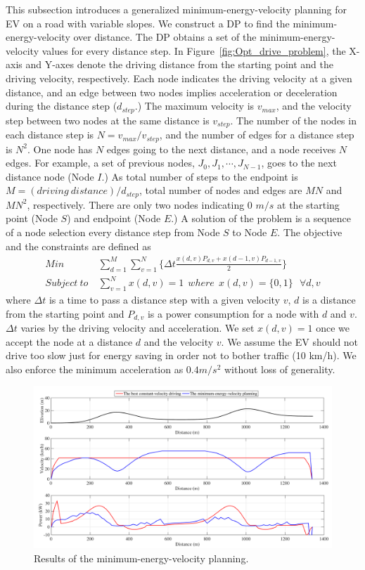 \documentclass{IEEEtran}
\begin{document}
This subsection introduces a generalized minimum-energy-velocity planning for EV  on a road with variable slopes. We construct a DP to find the minimum-energy-velocity over distance. The DP obtains a set of the minimum-energy-velocity values for every distance step. In Figure~\ref{fig:Opt_drive_problem}, the X-axis and Y-axes denote the driving distance from the starting point and the driving velocity, respectively. Each node indicates the driving velocity at a given distance, and an edge between two nodes implies acceleration or deceleration during the distance step ($d_{step}$.) The maximum velocity is $v_{max}$, and the velocity step between two nodes at the same distance is $v_{step}$. The number of the nodes in each distance step is $N = v_{max} / v_{step}$, and the number of edges for a distance step is $N^2$. One node has $N$ edges going to the next distance, and a node receives $N$ edges. For example, a set of previous nodes, $J_0, J_1, \cdots, J_{N-1}$, goes to the next distance node (Node $I$.) As total number of steps to the endpoint is $M = (driving~distance) / d_{step}$, total number of nodes and edges are $MN$ and $MN^2$, respectively. There are only two nodes indicating 0 $m/s$ at the starting point (Node $S$) and endpoint (Node $E$.) A solution of the problem is a sequence of a node selection every distance step from Node $S$ to Node $E$. The objective and the constraints are defined as
%
\begin{align} %
Min ~& \sum_{d=1}^{M}\sum_{v=1}^{N}\{\Delta t \frac{x(d,v)P_{d,v} + x(d-1,v)P_{d-1,v}}{2}\} \label{eq:objective}\\
Subject~to ~& \sum_{v=1}^{N}x(d,v) = 1~~where~~x(d,v) = \{0, 1\} ~~~\forall d, v \nonumber
\end{align}
%
where $\Delta t$ is a time to pass a distance step with a given velocity $v$, $d$ is a distance from the starting point and $P_{d,v}$ is a power consumption for a node with $d$ and $v$. $\Delta t$ varies by the driving velocity and acceleration. We set $x(d,v)=1$ once we accept the node at a distance $d$ and the velocity $v$.  We assume the EV should not drive too slow just for energy saving in order not to bother traffic (10 km/h). We also enforce the minimum acceleration as $ 0.4 m/s^2$ without loss of generality. 

\begin{figure}	%
\centering
\includegraphics[width=1.0\hsize]{Figures/velocity_planning_road_Z.pdf}
\caption{Results of the minimum-energy-velocity planning.}
\label{fig:no_deadline_trace}
\end{figure} 
\end{document}
